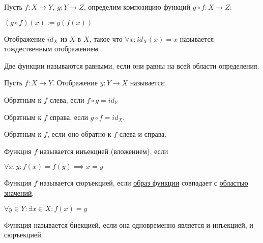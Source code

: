 \begin{definition}\label{def:intro-funccompose}
  Пусть $f\colon X \to Y,~g\colon Y \to Z$, определим композицию функций $g \circ f\colon X \to Z$:

  $(g \circ f)(x) := g(f(x))$
\end{definition}

\begin{definition}\label{def:intro-funcid}
  Отображение $id_X$ из $X$ в $X$, такое что $\forall x\colon id_X(x) = x$ называется тождественным отображением.
\end{definition}

\begin{definition}\label{def:intro-funceq}
  Две функции называются равными, если они равны на всей области определения.
\end{definition}

\begin{definition}\label{def:intro-funcinv}
  Пусть $f\colon X \to Y$. Отображение $y\colon Y \to X$ называется:
  \begin{compactitem}
  \item Обратным к $f$ слева, если $f \circ g = id_Y$
  \item Обратным к $f$ справа, если $g \circ f = id_X$.
  \item Обратным к $f$, если оно обратно к $f$ слева и справа.
  \end{compactitem}
\end{definition}

\begin{definition}\label{def:intro-funcinj}
  Функция $f$ называется инъекцией (вложением), если
  \begin{compactitem}
    \item $\forall x, y\colon f(x) = f(y) \implies x = y$
  \end{compactitem}
\end{definition}

\begin{definition}\label{def:intro-funcsur}
  Функция $f$ называется сюръекцией, если \hyperref[def:intro-funcim]{образ функции} совпадает с \hyperref[def:intro-func2]{областью значений}.
  \begin{compactitem}
    \item $\forall y \in Y\colon \exists x \in X\colon f(x) = y$
  \end{compactitem}
\end{definition}

\begin{definition}\label{def:intro-funcbi}
  Функция называется биекцией, если она одновременно является и инъекцией, и сюръекцией.
\end{definition}

